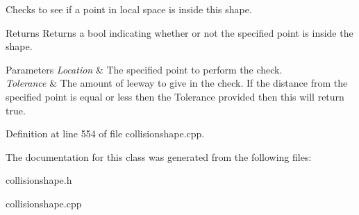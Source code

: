 Checks to see if a point in local space is inside this shape. 

\begin{DoxyReturn}{Returns}
Returns a bool indicating whether or not the specified point is inside the shape. 
\end{DoxyReturn}

\begin{DoxyParams}{Parameters}
{\em Location} & The specified point to perform the check. \\
\hline
{\em Tolerance} & The amount of leeway to give in the check. If the distance from the specified point is equal or less then the Tolerance provided then this will return true. \\
\hline
\end{DoxyParams}


Definition at line 554 of file collisionshape.cpp.



The documentation for this class was generated from the following files:\begin{DoxyCompactItemize}
\item 
collisionshape.h\item 
collisionshape.cpp\end{DoxyCompactItemize}
